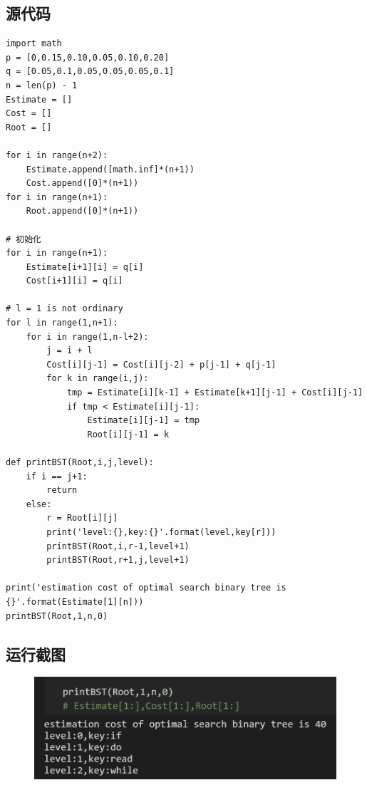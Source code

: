 \documentclass{ctexart}[UTF8]
\begin{document}
    \subsection{源代码}
    \begin{lstlisting}
import math
p = [0,0.15,0.10,0.05,0.10,0.20]
q = [0.05,0.1,0.05,0.05,0.05,0.1]
n = len(p) - 1
Estimate = []
Cost = []
Root = []

for i in range(n+2):
    Estimate.append([math.inf]*(n+1))
    Cost.append([0]*(n+1))
for i in range(n+1):
    Root.append([0]*(n+1))

# 初始化
for i in range(n+1):
    Estimate[i+1][i] = q[i]
    Cost[i+1][i] = q[i]

# l = 1 is not ordinary
for l in range(1,n+1):
    for i in range(1,n-l+2):
        j = i + l
        Cost[i][j-1] = Cost[i][j-2] + p[j-1] + q[j-1]
        for k in range(i,j):
            tmp = Estimate[i][k-1] + Estimate[k+1][j-1] + Cost[i][j-1]
            if tmp < Estimate[i][j-1]:
                Estimate[i][j-1] = tmp
                Root[i][j-1] = k

def printBST(Root,i,j,level):
    if i == j+1:
        return
    else:
        r = Root[i][j]
        print('level:{},key:{}'.format(level,key[r]))
        printBST(Root,i,r-1,level+1)
        printBST(Root,r+1,j,level+1)

print('estimation cost of optimal search binary tree is {}'.format(Estimate[1][n]))
printBST(Root,1,n,0)
\end{lstlisting}
\subsection{运行截图}
\begin{figure}[H]
    \centering
    \includegraphics[width=12cm]{../Resources/8_2.png}
\end{figure}
\end{document}
